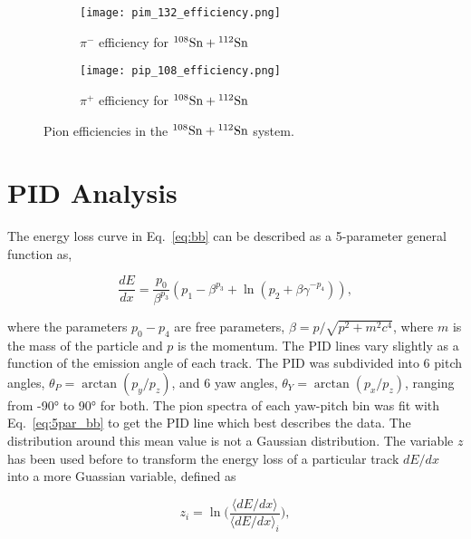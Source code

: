 \begin{figure}[!htb]
    \centering
    \begin{subfigure}[t]{0.49\textwidth}
        \centering
        \texttt{[image: pim\_132\_efficiency.png]}
        \caption{$\pi^-$ efficiency for ${}^{108}\mathrm{Sn} + {}^{112}\mathrm{Sn}$} \label{fig:pim_108_eff}
    \end{subfigure}
    \hfill
    \begin{subfigure}[t]{.49\textwidth}
        \centering
        \texttt{[image: pip\_108\_efficiency.png]} 
        \caption{$\pi^+$ efficiency for ${}^{108}\mathrm{Sn} + {}^{112}\mathrm{Sn}$} \label{fig:pip_108_eff}
    \end{subfigure}
  
    \caption{ Pion efficiencies in the ${}^{108}\mathrm{Sn} + {}^{112}\mathrm{Sn}$ system. }
\label{fig:108_eff}
\end{figure}


\section{PID Analysis}
\label{sec:pid}



The energy loss curve in Eq.~\ref{eq:bb} can be described as a 5-parameter general function as, 

\begin{equation}
\frac{dE}{dx} = \frac{p_0}{\beta^{p_3}}(p_1 - \beta^{p_3} + \ln(p_2 + {\beta\gamma}^{-p_4})),
\label{eq:5par_bb}
\end{equation}

where the parameters $p_0-p_4$ are free parameters, $\beta= p/\sqrt{p^2 + m^2c^4}$, where $m$ is the mass of the particle and $p$ is the momentum. The PID lines vary slightly as a function of the emission angle of each track. The PID was subdivided into 6 pitch angles, $\theta_P = \arctan(p_y/p_z)$, and 6 yaw angles, $\theta_Y = \arctan(p_x/p_z)$, ranging from \ang{-90} to \ang{90} for both. The pion spectra of each yaw-pitch bin was fit with Eq.~\ref{eq:5par_bb} to get the PID line which best describes the data. The distribution around this mean value is not a Gaussian distribution. The variable $z$ has been used before to transform the energy loss of a particular track $dE/dx$ into a more Guassian variable, defined as

\begin{equation}
z_i = \ln\Big(\frac{\langle dE/dx\rangle}{\langle dE/dx\rangle_i}\Big),
\end{equation}

